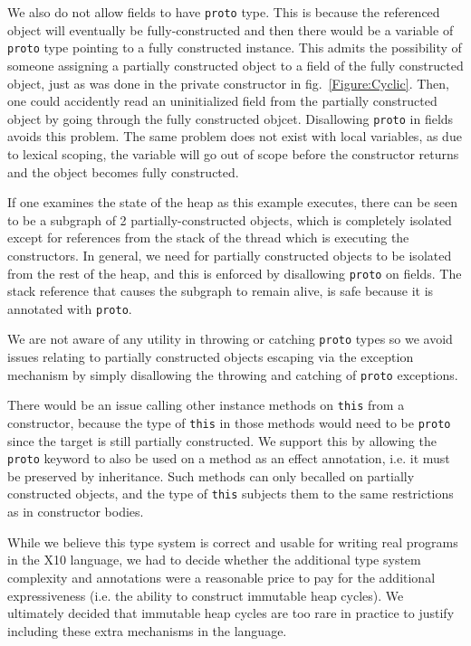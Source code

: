 We also do not allow fields to have \texttt{proto} type.  This is because the
referenced object will eventually be fully-constructed and then there would be
a variable of \texttt{proto} type pointing to a fully constructed instance.
This admits the possibility of someone assigning a partially constructed object
to a field of the fully constructed object, just as was done in the private
constructor in fig.~\ref{Figure:Cyclic}.  Then, one could accidently read an
uninitialized field from the partially constructed object by going through the
fully constructed objcet.  Disallowing \texttt{proto} in fields avoids this
problem.  The same problem does not exist with local variables, as due to
lexical scoping, the variable will go out of scope before the constructor
returns and the object becomes fully constructed.

If one examines the state of the heap as this example executes, there can be
seen to be a subgraph of 2 partially-constructed objects, which is completely
isolated except for references from the stack of the thread which is executing
the constructors.  In general, we need for partially constructed objects to be
isolated from the rest of the heap, and this is enforced by disallowing
\texttt{proto} on fields.  The stack reference that causes the subgraph to
remain alive, is safe because it is annotated with \texttt{proto}.

We are not aware of any utility in throwing or catching \texttt{proto} types so
we avoid issues relating to partially constructed objects escaping via the
exception mechanism by simply disallowing the throwing and catching of
\texttt{proto} exceptions.

There would be an issue calling other instance methods on \texttt{this} from a
constructor, because the type of \texttt{this} in those methods would need to
be \texttt{proto} since the target is still partially constructed.  We support
this by allowing the \texttt{proto} keyword to also be used on a method as an
effect annotation, i.e. it must be preserved by inheritance.  Such methods can
only becalled on partially constructed objects, and the type of \texttt{this}
subjects them to the same restrictions as in constructor bodies.

While we believe this type system is correct and usable for writing real
programs in the X10 language, we had to decide whether the additional type
system complexity and annotations were a reasonable price to pay for the
additional expressiveness (i.e. the ability to construct immutable heap
cycles).  We ultimately decided that immutable heap cycles are too rare in
practice to justify including these extra mechanisms in the language.

